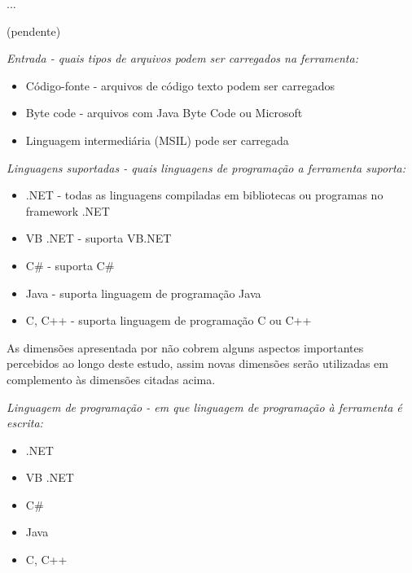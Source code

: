 {...}
\label{manutenabilidade-ferramentas}

(pendente)


\begin{description}

  \item {\it Entrada - quais tipos de arquivos podem ser carregados na ferramenta:}
    \begin{itemize}
      \item Código-fonte - arquivos de código texto podem ser carregados
      \item Byte code - arquivos com Java Byte Code ou Microsoft
      \item Linguagem intermediária (MSIL) pode ser carregada
    \end{itemize}

  \item {\it Linguagens suportadas - quais linguagens de programação a ferramenta suporta:}
    \begin{itemize}
      \item .NET - todas as linguagens compiladas em bibliotecas ou programas no framework .NET
      \item VB .NET - suporta VB.NET
      \item C\# - suporta C\#
      \item Java - suporta linguagem de programação Java
      \item C, C++ - suporta linguagem de programação C ou C++
    \end{itemize}

\end{description}

As dimensões apresentada por  não cobrem alguns aspectos
importantes percebidos ao longo deste estudo, assim novas dimensões serão utilizadas
em complemento às dimensões citadas acima.

\begin{description}

  \item {\it Linguagem de programação - em que linguagem de programação à ferramenta é escrita:}
    \begin{itemize}
      \item .NET
      \item VB .NET
      \item C\#
      \item Java
      \item C, C++
    \end{itemize}

\end{description}


